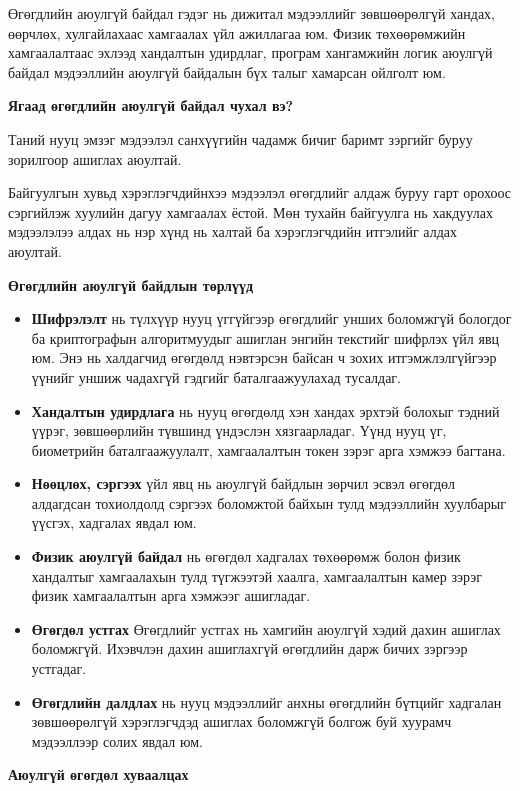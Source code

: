 Өгөгдлийн аюулгүй байдал гэдэг нь дижитал мэдээллийг зөвшөөрөлгүй хандах, өөрчлөх, хулгайлахаас хамгаалах үйл ажиллагаа юм. Физик төхөөрөмжийн хамгаалалтаас эхлээд хандалтын удирдлаг, програм хангамжийн логик аюулгүй байдал мэдээллийн аюулгүй байдалын бүх талыг хамарсан ойлголт юм.

\textbf{Ягаад өгөгдлийн аюулгүй байдал чухал вэ?}

Таний нууц эмзэг мэдээлэл санхүүгийн чадамж бичиг баримт зэргийг буруу зорилгоор ашиглах аюултай.

Байгуулгын хувьд хэрэглэгчдийнхээ мэдээлэл өгөгдлийг алдаж буруу гарт орохоос сэргийлэж хуулийн дагуу хамгаалах ёстой. Мөн тухайн байгуулга нь хакдуулах мэдээлэлээ алдах нь нэр хүнд нь халтай ба хэрэглэгчдийн итгэлийг алдах аюултай.

\textbf{Өгөгдлийн аюулгүй байдлын төрлүүд}
\begin{itemize}
    \item \textbf{Шифрэлэлт} нь түлхүүр нууц үггүйгээр өгөгдлийг унших боломжгүй бологдог ба криптографын алгоритмуудыг ашиглан энгийн текстийг шифрлэх үйл явц юм. Энэ нь халдагчид өгөгдөлд нэвтэрсэн байсан ч зохих итгэмжлэлгүйгээр үүнийг уншиж чадахгүй гэдгийг баталгаажуулахад тусалдаг.
    \item \textbf{Хандалтын удирдлага} нь нууц өгөгдөлд хэн хандах эрхтэй болохыг тэдний үүрэг, зөвшөөрлийн түвшинд үндэслэн хязгаарладаг. Үүнд нууц үг, биометрийн баталгаажуулалт, хамгаалалтын токен зэрэг арга хэмжээ багтана.
    \item \textbf{Нөөцлөх, сэргээх} үйл явц нь аюулгүй байдлын зөрчил эсвэл өгөгдөл алдагдсан тохиолдолд сэргээх боломжтой байхын тулд мэдээллийн хуулбарыг үүсгэх, хадгалах явдал юм.
    \item \textbf{Физик аюулгүй байдал} нь өгөгдөл хадгалах төхөөрөмж болон физик хандалтыг хамгаалахын тулд түгжээтэй хаалга, хамгаалалтын камер зэрэг физик хамгаалалтын арга хэмжээг ашигладаг.
    \item \textbf{Өгөгдөл устгах} Өгөгдлийг устгах нь хамгийн аюулгүй хэдий дахин ашиглах боломжгүй. Ихэвчлэн дахин ашиглахгүй өгөгдлийн дарж бичих зэргээр устгадаг.
    \item \textbf{Өгөгдлийн далдлах} нь нууц мэдээллийг анхны өгөгдлийн бүтцийг хадгалан зөвшөөрөлгүй хэрэглэгчдэд ашиглах боломжгүй болгож буй хуурамч мэдээллээр солих явдал юм.
\end{itemize}

\textbf{Аюулгүй өгөгдөл хуваалцах}




